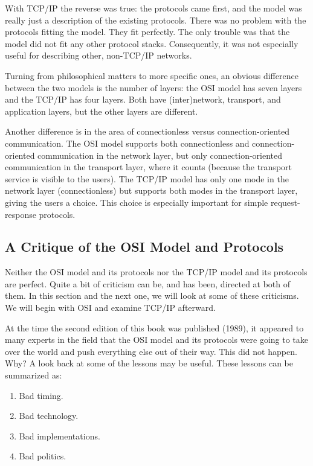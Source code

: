 \documentclass[b5paper,11pt]{memoir}
\begin{document}
With TCP/IP the reverse was true: the protocols came first, and the
model was really just a description of the existing protocols. There was
no problem with the protocols fitting the model. They fit perfectly. The
only trouble was that the {model} did not fit any other protocol stacks.
Consequently, it was not especially useful for describing other,
non-TCP/IP networks.

Turning from philosophical matters to more specific ones, an obvious
difference between the two models is the number of layers: the OSI model
has seven layers and the TCP/IP has four layers. Both have
(inter)network, transport, and application layers, but the other layers
are different.

Another difference is in the area of connectionless versus
connection-oriented communication. The OSI model supports both
connectionless and connection-oriented communication in the network
layer, but only connection-oriented communication in the transport
layer, where it counts (because the transport service is visible to the
users). The TCP/IP model has only one mode in the network layer
(connectionless) but supports both modes in the transport layer, giving
the users a choice. This choice is especially important for simple
request-response protocols.


\subsection{A Critique of the OSI Model and Protocols}

Neither the OSI model and its protocols nor the TCP/IP model and its
protocols are perfect. Quite a bit of criticism can be, and has been,
directed at both of them. In this section and the next one, we will look
at some of these criticisms. We will begin with OSI and examine TCP/IP
afterward.

At the time the second edition of this book was published (1989), it
appeared to many experts in the field that the OSI model and its
protocols were going to take over the world and push everything else out
of their way. This did not happen. Why? A look back at some of the
lessons may be useful. These lessons can be summarized as:

\begin{enumerate}
\item Bad timing.
\item Bad technology.
\item Bad implementations.
\item Bad politics.
\end{enumerate}
\end{document}

